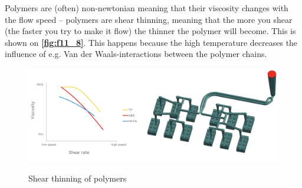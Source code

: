 Polymers are (often) non-newtonian meaning that their viscosity changes with the flow speed -- polymers are shear thinning, meaning that the more you shear (the faster you try to make it flow) the thinner the polymer will become. This is shown on \textbf{\autoref{fig:f11_8}}. This happens because the high temperature decreases the influence of e.g. Van der Waals-interactions between the polymer chains.
\begin{figure} [ht]
  \centering
  \caption{Shear thinning of polymers}
  \includegraphics[width=0.75\linewidth]{./figures/f11_8.png}
  \label{fig:f11_8}
\end{figure}
